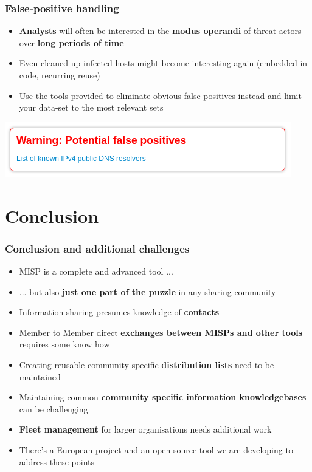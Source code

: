 \begin{frame}
\frametitle{False-positive handling}
\begin{itemize}
    \item \textbf{Analysts} will often be interested in the \textbf{modus operandi} of threat actors over \textbf{long periods of time}
	\item Even cleaned up infected hosts might become interesting again (embedded in code, recurring reuse)
	\item Use the tools provided to eliminate obvious false positives instead and limit your data-set to the most relevant sets
\end{itemize}
\centering\includegraphics[scale=0.8]{../images/false-positive.png}
\end{frame}

\section{Conclusion}

\begin{frame}
	\frametitle{Conclusion and additional challenges}
	\begin{itemize}
		\item MISP is a complete and advanced tool ...
		\item ... but also \textbf{just one part of the puzzle} in any sharing community
		\item Information sharing presumes knowledge of \textbf{contacts}
		\item Member to Member direct \textbf{exchanges between MISPs and other tools} requires some know how
		\item Creating reusable community-specific \textbf{distribution lists} need to be maintained
		\item Maintaining common \textbf{community specific information knowledgebases} can be challenging
		\item \textbf{Fleet management} for larger organisations needs additional work
        \item There's a European project and an open-source tool we are developing to address these points
	\end{itemize}
\end{frame}

